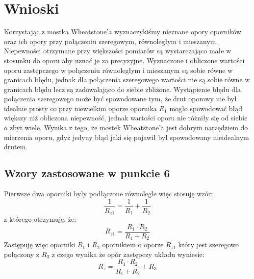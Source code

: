 \documentclass{article}
\begin{document}
    \section{Wnioski}
    
    Korzystając z mostka Wheatstone'a wyznaczykiśmy nieznane opory oporników oraz ich opory przy połączeniu szeregowym, równoległym i mieszanym. Niepewności otrzymane przy większości pomiarów są wystarczająco małe w stosunku do oporu aby uznać je za precyzyjne. Wyznaczone i obliczone wartości oporu zastępczego w połączeniu równoległym i mieszanym są sobie równe w granicach błędu, jednak dla połączenia szeregowego wartości nie są sobie równe w granicach błędu lecz są zadowalająco do siebie zbliżone. Wystąpienie błędu dla połączenia szeregowego może być spowodowane tym, że drut oporowy nie był idealnie prosty co przy niewielkim oporze opornika $R_1$ mogło spowodować błąd większy niż obliczona niepewność, jednak wartości oporu nie różniły się od siebie o zbyt wiele. Wynika z tego, że mostek Wheatstone'a jest dobrym narzędziem do mierzenia oporu, gdyż jedyny błąd jaki się pojawił był spowodowany nieidealnym drutem.
    
    \subsection{Wzory zastosowane w punkcie 6}
    Pierwsze dwa oporniki były podłączone równolegle więc stosuję wzór:
	\[
	    \frac{1}{R_{z1}}=\frac{1}{R_1}+\frac{1}{R_2}
	\]
	z którego otrzymuję, że:
	\[
	    R_{z1} = \frac{R_1\cdot R_2}{R_1+R_2}
	\]
    Zastępuję więc oporniki $R_1$ i $R_2$ opornikiem o oporze $R_{z1}$ który jest szeregowo połączony z $R_3$ z czego wynika że opór zastępczy układu wyniesie:
	\[
	    R_z=\frac{R_1\cdot R_2}{R_1+R_2}+R_3
	\]

	
\end{document}

